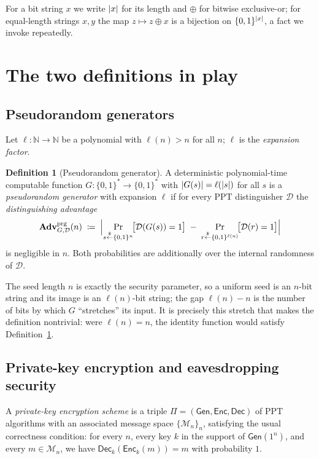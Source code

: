 \documentclass[11pt]{article}
\theoremstyle{plain}
\theoremstyle{definition}
\newtheorem{definition}{Definition}
\newcommand{\bit}{\{0,1\}}
\newcommand{\secp}{n}                       %
\newcommand{\dist}{\mathcal{D}}
\newcommand{\Enc}{\mathsf{Enc}}
\newcommand{\Dec}{\mathsf{Dec}}
\newcommand{\Gen}{\mathsf{Gen}}
\newcommand{\PPT}{\mathrm{PPT}}
\DeclarePairedDelimiter{\abs}{\lvert}{\rvert}
\newcommand{\getsr}{\overset{\$}{\leftarrow}}   %
\newcommand{\Adv}{\mathbf{Adv}}
\newcommand{\prg}{\mathrm{prg}}
\newcommand{\Pron}{\Pi}
\begin{document}
For a bit string $x$ we write $\abs{x}$ for its length and $\oplus$ for bitwise
exclusive-or; for equal-length strings $x,y$ the map $z \mapsto z \oplus x$ is a
bijection on $\bit^{\abs{x}}$, a fact we invoke repeatedly.

\section{The two definitions in play}

\subsection{Pseudorandom generators}

Let $\ell \colon \mathbb{N} \to \mathbb{N}$ be a polynomial with
$\ell(\secp) > \secp$ for all $\secp$; $\ell$ is the \emph{expansion factor}.

\begin{definition}[Pseudorandom generator]\label{def:prg}
A deterministic polynomial-time computable function
$G \colon \bit^{*} \to \bit^{*}$ with $\abs{G(s)} = \ell(\abs{s})$ for all $s$ is
a \emph{pseudorandom generator} with expansion $\ell$ if for every $\PPT$
distinguisher $\dist$ the \emph{distinguishing advantage}
\[
  \Adv^{\prg}_{G,\dist}(\secp)
  \;\coloneqq\;
  \Bigl\lvert
     \Pr_{s \getsr \bit^{\secp}}\!\bigl[\dist(G(s)) = 1\bigr]
     \;-\;
     \Pr_{r \getsr \bit^{\ell(\secp)}}\!\bigl[\dist(r) = 1\bigr]
  \Bigr\rvert
\]
is negligible in $\secp$. Both probabilities are additionally over the internal
randomness of $\dist$.
\end{definition}

The seed length $\secp$ is exactly the security parameter, so a uniform seed is
an $\secp$-bit string and its image is an $\ell(\secp)$-bit string; the gap
$\ell(\secp) - \secp$ is the number of bits by which $G$ ``stretches'' its input.
It is precisely this stretch that makes the definition nontrivial: were
$\ell(\secp) = \secp$, the identity function would satisfy
Definition~\ref{def:prg}.

\subsection{Private-key encryption and eavesdropping security}

A \emph{private-key encryption scheme} is a triple
$\Pron = (\Gen, \Enc, \Dec)$ of $\PPT$ algorithms with an associated message
space $\{\mathcal{M}_\secp\}_\secp$, satisfying the usual correctness condition:
for every $\secp$, every key $k$ in the support of $\Gen(1^\secp)$, and every
$m \in \mathcal{M}_\secp$, we have $\Dec_k(\Enc_k(m)) = m$ with probability $1$.
\end{document}
